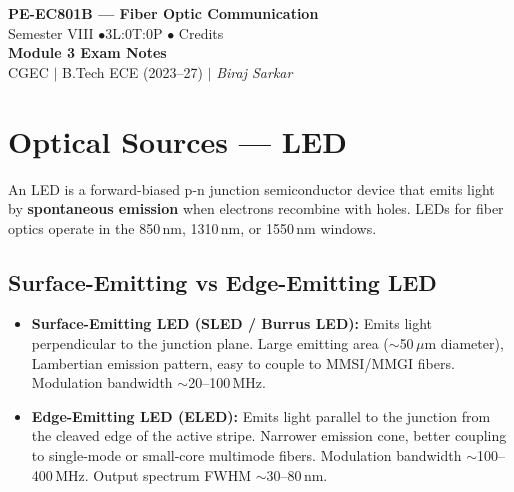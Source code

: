 \documentclass[12pt,a4paper]{article}
\begin{document}
\begin{center}
  {\LARGE\bfseries\color{myred} PE-EC801B --- Fiber Optic Communication}\\[5pt]
  {\normalsize\color{mydark} Semester VIII \quad$\bullet$\quad 3L:0T:0P \quad$\bullet$ Credits}\\[3pt]
  {\normalsize\color{myteal}\textbf{Module 3 Exam Notes}}\\[3pt]
  {\small\color{mydark} CGEC \;$|$\; B.Tech ECE (2023--27) \;$|$\; \textit{Biraj Sarkar}}
\end{center}
\vspace{2pt}
\noindent{\color{myred}\rule{\linewidth}{1.5pt}}
\vspace{2pt}

\hypersetup{linkcolor=mydark}
\tableofcontents
\hypersetup{linkcolor=myteal}
\newpage

\section{Optical Sources --- LED}

\begin{tcolorbox}[defbox, title={\textbf{Light-Emitting Diode (LED)}}]
An LED is a forward-biased p-n junction semiconductor device that emits light by \textbf{spontaneous emission} when electrons recombine with holes. LEDs for fiber optics operate in the 850\,nm, 1310\,nm, or 1550\,nm windows.
\end{tcolorbox}

\subsection{Surface-Emitting vs Edge-Emitting LED}
\begin{itemize}[leftmargin=*, itemsep=3pt]
  \item \textbf{Surface-Emitting LED (SLED / Burrus LED):} Emits light perpendicular to the junction plane. Large emitting area ($\sim$50\,$\mu$m diameter), Lambertian emission pattern, easy to couple to MMSI/MMGI fibers. Modulation bandwidth $\sim$20--100\,MHz.
  \item \textbf{Edge-Emitting LED (ELED):} Emits light parallel to the junction from the cleaved edge of the active stripe. Narrower emission cone, better coupling to single-mode or small-core multimode fibers. Modulation bandwidth $\sim$100--400\,MHz. Output spectrum FWHM $\sim$30--80\,nm.
\end{itemize}
\end{document}
